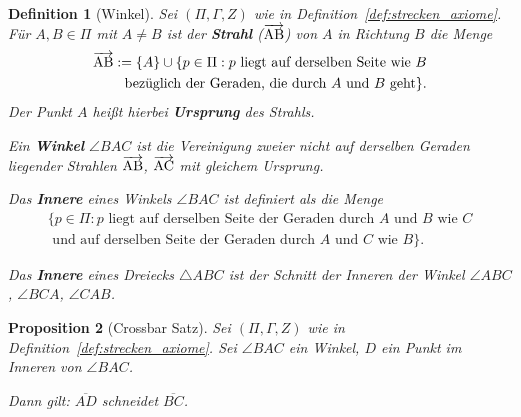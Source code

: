 \documentclass[a4paper,12pt]{article}
\theoremstyle{break}
\newtheorem{definition}{Definition}[section]
\newtheorem{proposition}[definition]{Proposition}
\begin{document}
\begin{definition}[Winkel]
Sei $(\Pi, \Gamma, Z)$ wie in Definition~\ref{def:strecken_axiome}. Für $A, B \in \Pi$ mit $A \neq B$ ist der \textbf{Strahl} ($\overrightarrow{\rm AB}$) von $A$ in Richtung $B$ die Menge
\begin{equation*}
\begin{split}
\overrightarrow{\rm AB} := \{A\} \cup \{p \in \Pi : p \text{ liegt auf derselben Seite wie } B\\ \text{ bezüglich der Geraden, die durch } A \text{ und } B \text{ geht}\}.
\end{split}
\end{equation*}
Der Punkt $A$ heißt hierbei \textbf{Ursprung} des Strahls.  

Ein \textbf{Winkel} $\angle BAC$ ist die Vereinigung zweier nicht auf derselben Geraden liegender Strahlen $\overrightarrow{\rm AB}$, $\overrightarrow{\rm AC}$ mit gleichem Ursprung.  

Das \textbf{Innere} eines Winkels $\angle BAC$ ist definiert als die Menge
\begin{equation*}
\begin{split}
\{p \in \Pi : p \text{ liegt auf derselben Seite der Geraden durch } A \text{ und } B \text{ wie } C \\ \text{ und auf derselben Seite der Geraden durch } A \text{ und } C \text{ wie } B\}.
\end{split}
\end{equation*}

Das \textbf{Innere} eines Dreiecks $\triangle ABC$ ist der Schnitt der Inneren der Winkel $\angle ABC$, $\angle BCA$, $\angle CAB$.
\end{definition}

\begin{proposition}[Crossbar Satz]\label{prop:crossbar}
Sei $(\Pi, \Gamma, Z)$ wie in Definition~\ref{def:strecken_axiome}. Sei $\angle BAC$ ein Winkel, $D$ ein Punkt im Inneren von $\angle BAC$. 

Dann gilt: $\overline{AD}$ schneidet $\overline{BC}$.
\end{proposition}
\end{document}
